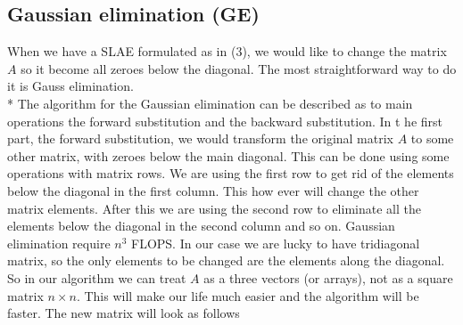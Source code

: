 \documentclass[10pt]{article}
\begin{document}
\subsection{Gaussian elimination (GE)} 
When we have a SLAE formulated as in (3), we would like to change the matrix $ A $ so it become all zeroes below the diagonal. The most straightforward way to do it is Gauss elimination. \\*
The algorithm for the Gaussian elimination can be described as to main operations the forward substitution and the backward substitution. In t	he first part, the forward substitution, we would transform the original matrix $ A $ to some other matrix, with zeroes below the main diagonal. This can be done using some operations with matrix rows. We are using the first row to get rid of the elements below the diagonal in the first column. This how ever will change the other matrix elements. After this we are using the second row to eliminate all the elements below the diagonal in the second column and so on. Gaussian elimination require $ n^{3} $ FLOPS. In our case we are lucky to have tridiagonal matrix, so the only elements to be changed are the elements along the diagonal. So in our algorithm we can treat $ A $ as a three vectors (or arrays), not as a square matrix $ n\times n $. This will make our life much easier and the algorithm will be faster.
The new matrix will look as follows 
\end{document}

